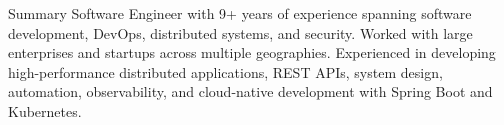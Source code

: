 \begin{rSection}{Summary}
    Software Engineer with 9+ years of experience spanning software development, DevOps, distributed systems, and security. 
    Worked with large enterprises and startups across multiple geographies. Experienced in developing high-performance distributed applications, REST APIs, system design, automation, observability, and cloud-native development with Spring Boot and Kubernetes.
\end{rSection}